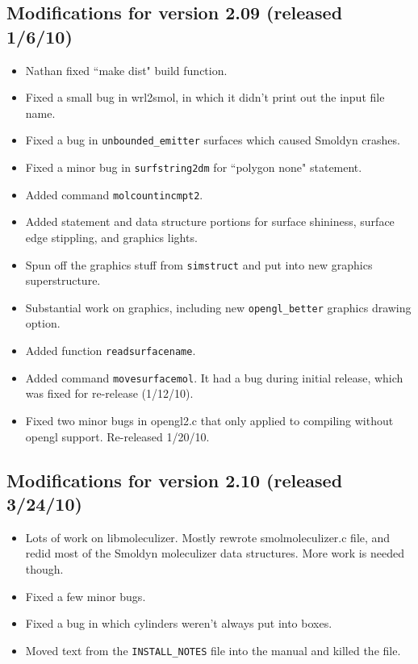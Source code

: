 \documentclass {scrbook}
\newcommand {\ttt} {\texttt}
\begin{document}
\subsection{Modifications for version 2.09 (released 1/6/10)}
\begin{itemize}
\item Nathan fixed ``make dist" build function.
\item Fixed a small bug in wrl2smol, in which it didn't print out the input file name.
\item Fixed a bug in \ttt{unbounded\_emitter} surfaces which caused Smoldyn crashes.
\item Fixed a minor bug in \ttt{surfstring2dm} for ``polygon none" statement.
\item Added command \ttt{molcountincmpt2}.
\item Added statement and data structure portions for surface shininess, surface edge stippling, and graphics lights.
\item Spun off the graphics stuff from \ttt{simstruct} and put into new graphics superstructure.
\item Substantial work on graphics, including new \ttt{opengl\_better} graphics drawing option.
\item Added function \ttt{readsurfacename}.
\item Added command \ttt{movesurfacemol}. It had a bug during initial release, which was fixed for re-release (1/12/10).
\item Fixed two minor bugs in opengl2.c that only applied to compiling without opengl support. Re-released 1/20/10.
\end{itemize}

\subsection{Modifications for version 2.10 (released 3/24/10)}
\begin{itemize}
\item Lots of work on libmoleculizer. Mostly rewrote smolmoleculizer.c file, and redid most of the Smoldyn moleculizer data structures. More work is needed though.
\item Fixed a few minor bugs.
\item Fixed a bug in which cylinders weren't always put into boxes.
\item Moved text from the \ttt{INSTALL\_NOTES} file into the manual and killed the file.
\end{itemize}
\end{document}
